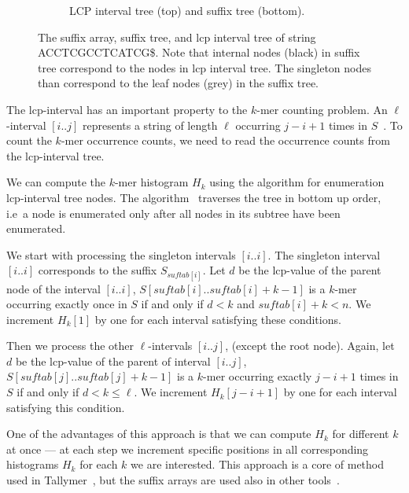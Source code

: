 \begin{figure}[htp]
\begin{subfigure}[m]{0.47\textwidth}
   \caption{LCP interval tree (top) and suffix tree (bottom).}
\end{subfigure}
\caption[The suffix array, suffix tree, and lcp interval tree]{The suffix array, suffix tree, and lcp interval tree of string ACCTCGCCTCATCG\$. Note that internal nodes (black) in suffix tree correspond to the nodes in lcp interval tree. The singleton nodes than correspond to the leaf nodes (grey) in the suffix tree.}\label{fig:enhancedsuffixarray}
\end{figure}
The lcp-interval has an important property to the $k$-mer counting problem. An $\ell$-interval $[i..j]$ represents a string of length $\ell$ occurring $j - i + 1$ times in $S$~\cite{tallymer}. To count the $k$-mer occurrence counts, we need to read the occurrence counts from the lcp-interval tree.

We can compute the $k$-mer histogram $H_k$ using the algorithm for enumeration lcp-interval tree nodes. The algorithm~\cite{enhancedsuffixarrays} traverses the tree in bottom up order, i.e\ a node is enumerated only after all nodes in its subtree have been enumerated.

We start with processing the singleton intervals $[i..i]$. The singleton interval $[i..i]$ corresponds to the suffix $S_{suftab[i]}$. Let $d$ be the lcp-value of the parent node of the interval $[i..i]$, $S[suftab[i]..suftab[i]+k-1]$ is a $k$-mer occurring exactly once in $S$ if and only if $d < k$ and $suftab[i]+k < n$. We increment $H_k[1]$ by one for each interval satisfying these conditions.

Then we process the other $\ell$-intervals $[i..j]$, (except the root node). Again, let $d$ be the lcp-value of the parent of interval $[i..j]$, $S[suftab[j]..suftab[j] + k - 1]$ is a $k$-mer occurring exactly $j - i + 1$ times in $S$ if and only if $d < k \leq \ell$. We increment $H_k[j-i+1]$ by one for each interval satisfying this condition.

One of the advantages of this approach is that we can compute $H_k$ for different $k$ at once --- at each step we increment specific positions in all corresponding histograms $H_k$ for each $k$ we are interested. This approach is a core of method used in Tallymer~\cite{tallymer}, but the suffix arrays are used also in other tools~\cite{jellyfish}.


